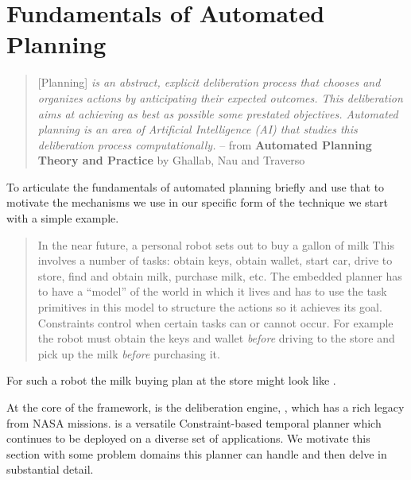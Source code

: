 \section{Fundamentals of  Automated Planning}
\label{sec:europa}

{\footnotesize
  \begin{quote}
[Planning] \emph{is an abstract, explicit deliberation process that chooses and
organizes actions by anticipating their expected outcomes. This
deliberation aims at achieving as best as possible some prestated
objectives. Automated planning is an area of Artificial Intelligence
(AI) that studies this deliberation process computationally.} -- from
\textbf{Automated Planning Theory and Practice} by Ghallab, Nau and
Traverso \cite{ghallab04} 
\end{quote}
}

To articulate the fundamentals of automated planning briefly and use
that to motivate the mechanisms we use in our specific form of the
technique we start with a simple example.

\begin{quotation}

  In the near future, a personal robot sets out to buy a gallon of milk
  This involves a number of tasks: obtain keys, obtain wallet,
  start car, drive to store, find and obtain milk, purchase milk, etc.
  The embedded planner has to have a ``model'' of the world in which it
  lives and has to use the task primitives in this model to structure
  the actions so it achieves its goal. Constraints control when certain
  tasks can or cannot occur. For example the robot must obtain the keys
  and wallet \emph{before} driving to the store and pick up the milk
  \emph{before} purchasing it.

\end{quotation}

For such a robot the milk buying plan at the store might look like
.



At the core of the \rx framework, is the deliberation engine, \eu,
which has a rich legacy from NASA missions. \eu is a versatile
Constraint-based temporal planner which continues to be deployed on a
diverse set of applications. We motivate this section with some
problem domains this planner can handle and then delve in substantial
detail.

